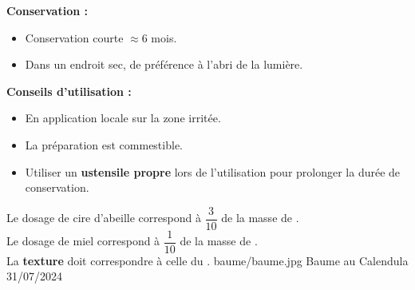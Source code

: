 {%
    \textbf{Conservation :}
    \begin{itemize}[label=\faPen]
        \item Conservation courte $\approx 6$ mois.
        \item Dans un endroit sec, de préférence à l'abri de la lumière. 
    \end{itemize}
    \textbf{Conseils d'utilisation :}
    \begin{itemize}[label=\faPen]
        \item En application locale sur la zone irritée.
        \item La préparation est commestible.
        \item Utiliser un \textbf{ustensile propre} lors de l'utilisation pour prolonger la durée de conservation. 
    \end{itemize}
}
{%
    Le dosage de cire d'abeille correspond à $\dfrac{3}{10}$ de la masse de \macerat.\\
    Le dosage de miel correspond à $\dfrac{1}{10}$ de la masse de \macerat.\\
    La \textbf{texture} doit correspondre à celle du .
}
{%
    baume/baume.jpg
}
{%
    Baume au Calendula
}
{%
    31/07/2024
}